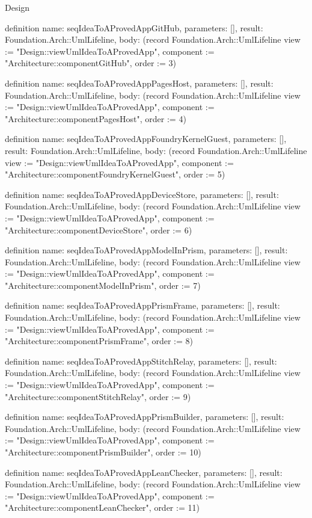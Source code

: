 \begin{lexlean}{Design}
\begin{semanticmodule}
definition{
  name: seqIdeaToAProvedAppGitHub,
  parameters: [],
  result: Foundation.Arch::UmlLifeline,
  body: (record Foundation.Arch::UmlLifeline {view := "Design::viewUmlIdeaToAProvedApp", component := "Architecture::componentGitHub", order := 3})
}

definition{
  name: seqIdeaToAProvedAppPagesHost,
  parameters: [],
  result: Foundation.Arch::UmlLifeline,
  body: (record Foundation.Arch::UmlLifeline {view := "Design::viewUmlIdeaToAProvedApp", component := "Architecture::componentPagesHost", order := 4})
}

definition{
  name: seqIdeaToAProvedAppFoundryKernelGuest,
  parameters: [],
  result: Foundation.Arch::UmlLifeline,
  body: (record Foundation.Arch::UmlLifeline {view := "Design::viewUmlIdeaToAProvedApp", component := "Architecture::componentFoundryKernelGuest", order := 5})
}

definition{
  name: seqIdeaToAProvedAppDeviceStore,
  parameters: [],
  result: Foundation.Arch::UmlLifeline,
  body: (record Foundation.Arch::UmlLifeline {view := "Design::viewUmlIdeaToAProvedApp", component := "Architecture::componentDeviceStore", order := 6})
}

definition{
  name: seqIdeaToAProvedAppModelInPrism,
  parameters: [],
  result: Foundation.Arch::UmlLifeline,
  body: (record Foundation.Arch::UmlLifeline {view := "Design::viewUmlIdeaToAProvedApp", component := "Architecture::componentModelInPrism", order := 7})
}

definition{
  name: seqIdeaToAProvedAppPrismFrame,
  parameters: [],
  result: Foundation.Arch::UmlLifeline,
  body: (record Foundation.Arch::UmlLifeline {view := "Design::viewUmlIdeaToAProvedApp", component := "Architecture::componentPrismFrame", order := 8})
}

definition{
  name: seqIdeaToAProvedAppStitchRelay,
  parameters: [],
  result: Foundation.Arch::UmlLifeline,
  body: (record Foundation.Arch::UmlLifeline {view := "Design::viewUmlIdeaToAProvedApp", component := "Architecture::componentStitchRelay", order := 9})
}

definition{
  name: seqIdeaToAProvedAppPrismBuilder,
  parameters: [],
  result: Foundation.Arch::UmlLifeline,
  body: (record Foundation.Arch::UmlLifeline {view := "Design::viewUmlIdeaToAProvedApp", component := "Architecture::componentPrismBuilder", order := 10})
}

definition{
  name: seqIdeaToAProvedAppLeanChecker,
  parameters: [],
  result: Foundation.Arch::UmlLifeline,
  body: (record Foundation.Arch::UmlLifeline {view := "Design::viewUmlIdeaToAProvedApp", component := "Architecture::componentLeanChecker", order := 11})
}


\end{semanticmodule}
\end{lexlean}

